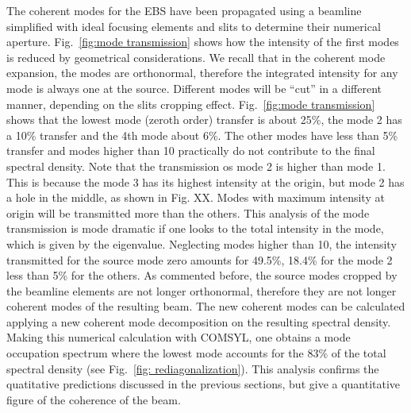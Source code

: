 \documentclass{iucr}              %
\begin{document}
The coherent modes for the EBS have been propagated using a beamline simplified with ideal focusing elements and slits to determine their numerical aperture. Fig.~\ref{fig:mode transmission} shows how the intensity of the first modes is reduced by geometrical considerations. We recall that in the coherent mode expansion, the modes are orthonormal, therefore the integrated intensity for any mode is always one at the source. Different modes will be ``cut'' in a different manner, depending on the slits cropping effect. Fig.~\ref{fig:mode transmission} shows that the lowest mode (zeroth order) transfer is about 25\%, the mode 2 has a 10\% transfer and the 4th mode about 6\%. The other modes have less than 5\% transfer and modes higher than 10 practically do not contribute to the final spectral density. Note that the transmission os mode 2 is higher than mode 1. This is because the mode 3 has its highest intensity at the origin, but mode 2 has a hole in the middle, as shown in Fig. XX. Modes with maximum intensity at origin will be transmitted more than the others. This analysis of the mode transmission is mode dramatic if one looks to the total intensity in the mode, which is given by the eigenvalue. Neglecting modes higher than 10, the intensity transmitted for the source mode zero amounts for 49.5\%, 18.4\% for the mode 2 less than 5\% for the others. As commented before, the source modes cropped by the beamline elements are not longer orthonormal, therefore they are not longer coherent modes of the resulting beam. The new coherent modes can be calculated applying a new coherent mode decomposition on the resulting spectral density. Making this numerical calculation with COMSYL, one obtains a mode occupation spectrum where the lowest mode accounts for the 83\% of the total spectral density (see Fig.~\ref{fig: rediagonalization}). This analysis confirms the quatitative predictions discussed in the previous sections, but give a quantitative figure of the coherence of the beam. 



\end{document}
